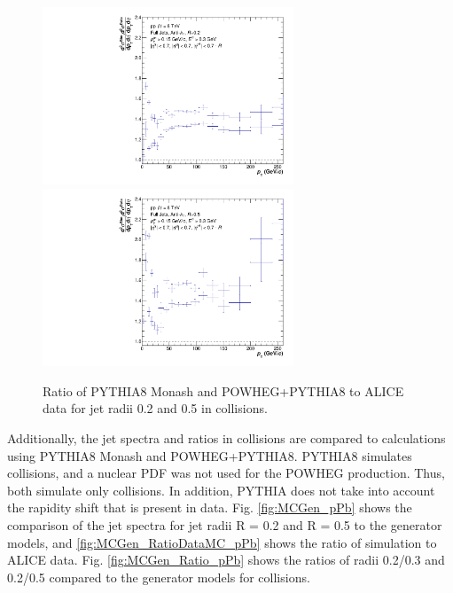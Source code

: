 \begin{figure}
    \centering
    \begin{multicols}{2}
            \includegraphics[width=7.5cm]{figures/MCGen/ratioDataMC/ratio_simdata_R02_nooutlier.pdf}
        \vfill\null
        \columnbreak
            \includegraphics[width=7.5cm]{figures/MCGen/ratioDataMC/ratio_simdata_R05_nooutlier.pdf}
        \vfill\null
    \end{multicols}
    \caption{Ratio of PYTHIA8 Monash and POWHEG+PYTHIA8 to ALICE data for jet radii 0.2 and 0.5 in \pp collisions.}
    \label{fig:MCGen_RatioDataMC}
\end{figure}

Additionally, the jet spectra and ratios in \pPb collisions are compared to calculations using PYTHIA8 Monash and POWHEG+PYTHIA8. PYTHIA8 simulates \pp collisions, and a nuclear PDF was not used for the POWHEG production. Thus, both simulate only \pp collisions. In addition, PYTHIA does not take into account the rapidity shift that is present in data. Fig. \ref{fig:MCGen_pPb} shows the comparison of the \pPb jet spectra for jet radii R = 0.2 and R = 0.5 to the generator models, and \ref{fig:MCGen_RatioDataMC_pPb} shows the ratio of simulation to \pPb ALICE data. Fig. \ref{fig:MCGen_Ratio_pPb} shows the ratios of radii 0.2/0.3 and 0.2/0.5 compared to the generator models for \pPb collisions. 

